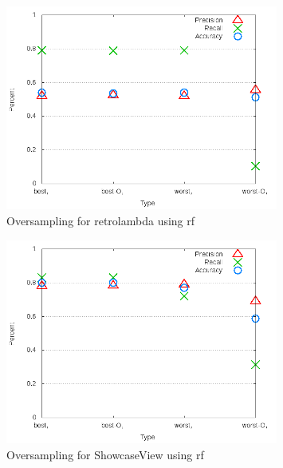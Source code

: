 \begin{figure}[!t]
\centering
\includegraphics[width=0.8\textwidth]{images/rf/test_4/retrolambda_sample_range.png}
\caption{Oversampling for retrolambda using \gls{rf}}
\label{fig:test_4_retrolambda_rf}
\end{figure}

\begin{figure}[!t]
\centering
\includegraphics[width=0.8\textwidth]{images/rf/test_4/ShowcaseView_sample_range.png}
\caption{Oversampling for ShowcaseView using \gls{rf}}
\label{fig:test_4_ShowcaseView_rf}
\end{figure}

